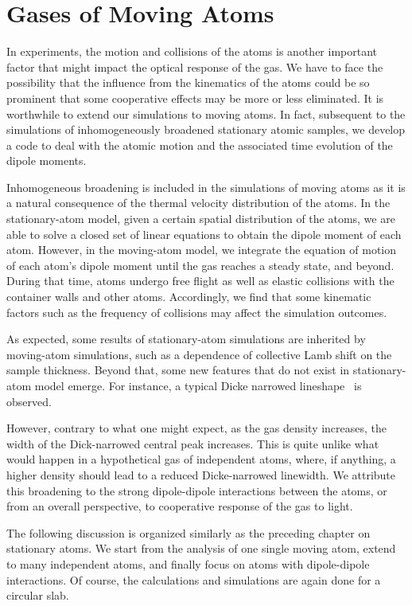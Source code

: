 \chapter{Gases of Moving Atoms}
In experiments, the motion and collisions of the atoms is another important factor that might impact the optical response of the gas. We have to face the possibility that the influence from the kinematics of the atoms could be so prominent that some cooperative effects may be more or less eliminated. It is worthwhile to extend our simulations to moving atoms. In fact, subsequent to the simulations of inhomogeneously broadened stationary atomic samples, we develop a code to deal with the atomic motion and the associated time evolution of the dipole moments. 

Inhomogeneous broadening is included in the simulations of moving atoms as it is a natural consequence of the thermal velocity distribution of the atoms. In the stationary-atom model, given a certain spatial distribution of the atoms, we are able to solve a closed set of linear equations to obtain the dipole moment of each atom.  However, in the moving-atom model, we integrate the equation of motion of each atom's dipole moment until the gas reaches a steady state, and beyond. During that time, atoms undergo free flight as well as elastic collisions with the container walls and other atoms. Accordingly, we find that some kinematic factors such as the frequency of collisions may affect the simulation outcomes.

As expected, some results of stationary-atom simulations are inherited by moving-atom simulations, such as a dependence of collective Lamb shift on the sample thickness. Beyond that, some new features that do not exist in stationary-atom model emerge. For instance, a typical Dicke narrowed lineshape~\cite{PhysRev.89.472} is observed.

However, contrary to what one might expect, as the gas density increases, the width of the Dick-narrowed central peak increases. This is quite unlike what would happen in a hypothetical gas of independent atoms, where, if anything, a higher density should lead to a reduced Dicke-narrowed linewidth. We attribute this broadening to the strong dipole-dipole interactions between the atoms, or from an overall perspective, to cooperative response of the gas to light. 

The following discussion is organized similarly as the preceding chapter on stationary atoms. We start from the analysis of one single moving atom, extend to many independent atoms, and finally focus on atoms with dipole-dipole interactions. Of course, the calculations and simulations are again done for a circular slab.

